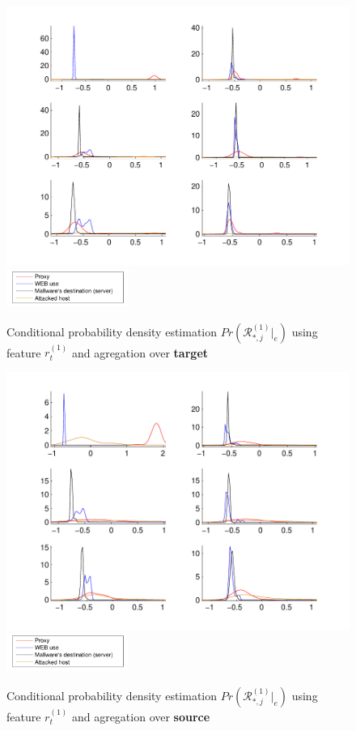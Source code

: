 \documentclass[a4paper,journal]{IEEEtran}
\begin{document}
\begin{figure}[h!]%
  \centering
  \includegraphics[width=140mm]{dens_dst_bdivp}
      \includegraphics[width=40mm]{legend}
  \caption{Conditional probability density estimation $Pr ( \mathcal{R}^{(1)}_{*,j}|_e ) $ using feature $r_t^{(1)}$ and agregation over \textbf{target}}
  \label{fig:dens_dst_bdivp}
\end{figure}
\begin{figure}[h!]%
  \centering
  \includegraphics[width=140mm]{dens_src_bdivp}
    \includegraphics[width=40mm]{legend}
  \caption{Conditional probability density estimation $Pr ( \mathcal{R}^{(1)}_{*,j}|_e ) $ using feature $r_t^{(1)}$ and agregation over \textbf{source}}
  \label{fig:dens_src_bdivp}
\end{figure}
\end{document}
